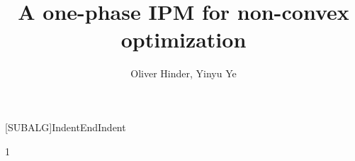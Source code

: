 \documentclass{article}
\begin{document}
\title{A one-phase IPM for non-convex optimization}
\author{Oliver Hinder, Yinyu Ye}

[SUBALG]{Indent}{EndIndent}{}{\algorithmicend\ }%

\maketitle

\def\inProgress{0}

\if\inProgress1
\newcommand{\inProgressHide}[1]{} %
\newcommand{\yinyu}[1]{}
\newcommand{\hinder}[1]{}
\else
\newcommand{\inProgressHide}[1]{#1} %
\newcommand{\yinyu}[1]{{\color{red} Yinyu: #1}}
\newcommand{\hinder}[1]{{\color{red}{Hinder: #1}}}
\fi



\newcommand{\algorithmicbreak}{\textbf{break}}
\newcommand{\obj}{f}
\newcommand{\cons}{a}
\newcommand{\hess}{\grad^2}
\newcommand{\nvar}{n}
\newcommand{\ncon}{m}

\newcommand{\eye}{I}





\newcommand{\parNumCor}{j_{\max}}
\newcommand{\parNumCorValue}{3}



\newcommand{\parComp}{\beta_{1}}
\newcommand{\parCompValue}{0.01}
\newcommand{\parCompInterval}{(0,1)}

\newcommand{\parCompAgg}{\beta_{2}}
\newcommand{\parCompAggValue}{0.02}
\newcommand{\parCompAggInterval}{(\parComp,1)}

\newcommand{\parMinStableStepSize}{\beta_{3}}
\newcommand{\parMinStableStepSizeValue}{2^{-5}}
\newcommand{\parMinStableStepSizeInterval}{(0,1)}

\newcommand{\parKKTReductFactor}{\beta_{4}}
\newcommand{\parKKTReductFactorValue}{0.01}
\newcommand{\parKKTReductFactorInterval}{(0,1)}

\newcommand{\parObjReductFactor}{\beta_{5}}
\newcommand{\parObjReductFactorValue}{0.2}
\newcommand{\parObjReductFactorInterval}{(0,1)}

\newcommand{\parBacktracking}{\beta_{6}}
\newcommand{\parBacktrackingValue}{0.5}
\newcommand{\parBacktrackingInterval}{(0,1)}

\newcommand{\parFracBoundary}{\beta_{7}}
\newcommand{\parFracBoundaryValue}{0.1}
\newcommand{\parFracBoundaryInterval}{(0,1)}
\end{document}

